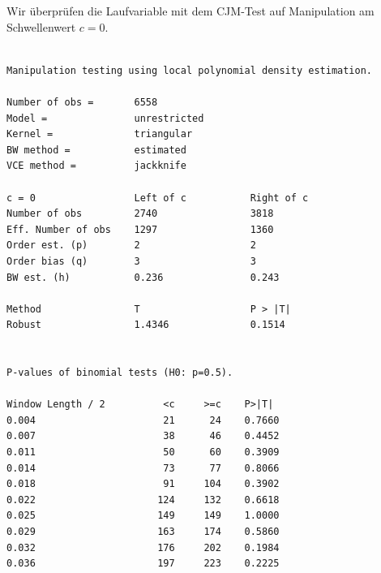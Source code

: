 \documentclass[
  a4paper,
  DIV=11,
  oneside]{scrreprt}
\newenvironment{Shaded}{\begin{snugshade}}{\end{snugshade}}
\newcommand{\AttributeTok}[1]{\textcolor[rgb]{0.40,0.45,0.13}{#1}}
\newcommand{\CommentTok}[1]{\textcolor[rgb]{0.37,0.37,0.37}{#1}}
\newcommand{\FunctionTok}[1]{\textcolor[rgb]{0.28,0.35,0.67}{#1}}
\newcommand{\NormalTok}[1]{\textcolor[rgb]{0.00,0.23,0.31}{#1}}
\newcommand{\OtherTok}[1]{\textcolor[rgb]{0.00,0.23,0.31}{#1}}
\newcommand{\SpecialCharTok}[1]{\textcolor[rgb]{0.37,0.37,0.37}{#1}}
\newcommand{\StringTok}[1]{\textcolor[rgb]{0.13,0.47,0.30}{#1}}
\begin{document}
Wir überprüfen die Laufvariable mit dem CJM-Test auf Manipulation am
Schwellenwert \(c=0\).

\begin{Shaded}
\end{Shaded}

\begin{verbatim}

Manipulation testing using local polynomial density estimation.

Number of obs =       6558
Model =               unrestricted
Kernel =              triangular
BW method =           estimated
VCE method =          jackknife

c = 0                 Left of c           Right of c          
Number of obs         2740                3818                
Eff. Number of obs    1297                1360                
Order est. (p)        2                   2                   
Order bias (q)        3                   3                   
BW est. (h)           0.236               0.243               

Method                T                   P > |T|             
Robust                1.4346              0.1514              


P-values of binomial tests (H0: p=0.5).

Window Length / 2          <c     >=c    P>|T|
0.004                      21      24    0.7660
0.007                      38      46    0.4452
0.011                      50      60    0.3909
0.014                      73      77    0.8066
0.018                      91     104    0.3902
0.022                     124     132    0.6618
0.025                     149     149    1.0000
0.029                     163     174    0.5860
0.032                     176     202    0.1984
0.036                     197     223    0.2225
\end{verbatim}

\begin{Shaded}
\end{Shaded}
\end{document}

